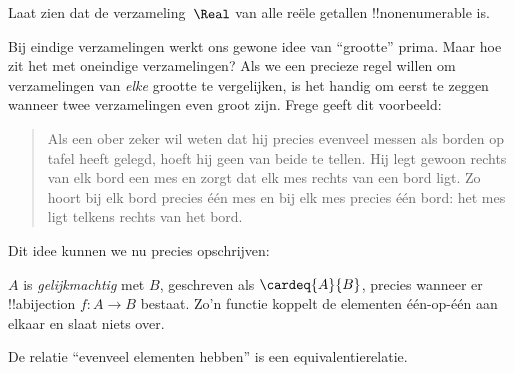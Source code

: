 \documentclass[openany]{memoir}
\begin{document}
\begin{prob}
Laat zien dat de verzameling~$\Real$ van alle reële getallen
!!{nonenumerable} is.
\end{prob}
\endgroup

\begingroup
\def\olfilename{OLP-0035}
\def\olfilepath{content/sets-functions-relations/size-of-sets/}
\hypertarget{unit-OLP-0035}{}





Bij eindige verzamelingen werkt ons gewone idee van ``grootte'' prima. Maar
hoe zit het met oneindige verzamelingen? Als we een precieze regel willen om
verzamelingen van \emph{elke} grootte te vergelijken, is het handig om
eerst te zeggen wanneer twee verzamelingen even groot zijn. Frege geeft dit voorbeeld:
\begin{quote}
  Als een ober zeker wil weten dat hij precies evenveel messen als borden op
  tafel heeft gelegd, hoeft hij geen van beide te tellen. Hij legt gewoon rechts
  van elk bord een mes en zorgt dat elk mes rechts van een bord ligt. Zo hoort
  bij elk bord precies één mes en bij elk mes precies één bord: het mes ligt
  telkens rechts van het bord. \citep[\S70]{Frege1884}
\end{quote}
Dit idee kunnen we nu precies opschrijven:

\begin{defn}
  $A$ is \emph{gelijkmachtig} met $B$, geschreven als $\cardeq{A}{B}$,
  precies wanneer er !!a{bijection} $f \colon A \to B$ bestaat. Zo'n functie
  koppelt de elementen één-op-één aan elkaar en slaat niets over.
\end{defn}

\begin{prop}
De relatie ``evenveel elementen hebben'' is een equivalentierelatie.
\end{prop}
\end{document}
